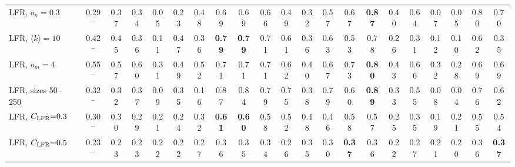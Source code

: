 \begin{table}[p]
{\begin{tabular}{llcccc|cc|cccccc|cccccccc}
LFR, $o_n{=}0.3$ &  & 0.29$^{-}$ & 0.37 & 0.34 & 0.05 & 0.23 & 0.48 & 0.69 & 0.69 & 0.66 & 0.49 & 0.32 & 0.57 & 0.67 & \textbf{0.87} & 0.40 & 0.64 & 0.07 & 0.05 & 0.80 & 0.70 \\
LFR, $\langle k\rangle{=}10$ &  & 0.42$^{-}$ & 0.45 & 0.36 & 0.11 & 0.47 & 0.36 & \textbf{0.79} & \textbf{0.79} & 0.71 & 0.61 & 0.36 & 0.63 & 0.53 & 0.78 & 0.26 & 0.31 & 0.12 & 0.10 & 0.62 & 0.35 \\
LFR, $o_m{=}4$ &  & 0.55$^{-}$ & 0.57 & 0.60 & 0.31 & 0.49 & 0.52 & 0.71 & 0.71 & 0.71 & 0.62 & 0.40 & 0.67 & 0.73 & \textbf{0.80} & 0.43 & 0.66 & 0.32 & 0.28 & 0.69 & 0.69 \\
LFR, sizes 50--250 &  & 0.32$^{-}$ & 0.32 & 0.37 & 0.09 & 0.35 & 0.16 & 0.87 & 0.84 & 0.79 & 0.75 & 0.38 & 0.79 & 0.60 & \textbf{0.89} & 0.33 & 0.55 & 0.08 & 0.04 & 0.76 & 0.62 \\
LFR, $C_{\rm LFR}{=}0.3$ &  & 0.30$^{-}$ & 0.30 & 0.29 & 0.21 & 0.24 & 0.32 & \textbf{0.61} & \textbf{0.60} & 0.58 & 0.52 & 0.48 & 0.46 & 0.58 & 0.57 & 0.25 & 0.35 & 0.19 & 0.21 & 0.55 & 0.54 \\
LFR, $C_{\rm LFR}{=}0.5$ &  & 0.23$^{-}$ & 0.23 & 0.23 & 0.22 & 0.22 & 0.27 & 0.36 & 0.35 & 0.34 & 0.26 & 0.35 & 0.30 & \textbf{0.37} & 0.36 & 0.22 & 0.27 & 0.21 & 0.20 & 0.36 & \textbf{0.37} \\
\hline\hline
\end{tabular}}
\end{table}

